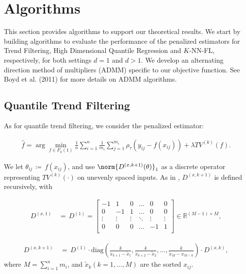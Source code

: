 \documentclass[twoside,11pt]{article}
\begin{document}
\section{Algorithms}
This section provides algorithms to support our theoretical results. We start by building algorithms to evaluate the performance of the penalized estimators for Trend Filtering, High Dimensional Quantile Regression and \( K \)-NN-FL, respectively, for both settings \( d = 1 \) and \( d > 1 \). 
We develop an alternating direction method of multipliers (ADMM) specific to our objective function. See Boyd et al. (2011) for more details on ADMM algorithms.
\subsection{Quantile Trend Filtering}



As for quantile trend filtering, we consider the penalized estimator:

\begin{align}
\label{70}
\hat{f} = \arg\min_{f\in F_k(1)} \frac{1}{n} \sum_{i=1}^{n} \frac{1}{m_i} \sum_{j=1}^{m_i} \rho_{\tau}(y_{ij} - f(x_{ij})) + \lambda TV^{(k)}(f). 
\end{align}

We let $\theta_{ij} \,\coloneqq\, f(x_{ij})$, and use $\norm{D^{(x, k+1)}(\theta)}_1$ as a discrete operator representing $TV^{(k)}(\cdot)$ on unevenly spaced inputs. As in \cite{tibshirani2014adaptive}, $D^{(x, k+1)}$ is defined recursively, with



\begin{align}
\label{71}
D^{(x, 1)} &\,=\, D^{(1)} = \begin{bmatrix}
    -1 &  1 & 0 & \dots & 0 & 0\\
     0 & -1 & 1 & \dots & 0 & 0\\
     \vdots & \vdots & \vdots & \ddots & \vdots & \vdots\\
     0 & 0 & 0 & \dots & -1 & 1 \\
\end{bmatrix} \in \mathbb{R}^{{(M - 1)} \times {M}},
\end{align}


\begin{align}
\label{72}
D^{(x, k+1)} &\,=\, D^{(1)} \cdot \text{diag}\left(\frac{k}{\tilde{x}_{k+1} - \tilde{x}_{1}}, \frac{k}{\tilde{x}_{k+2} - \tilde{x}_{2}}, \ldots, \frac{k}{\tilde{x}_{M} - x_{{M}-k}}\right) \cdot D^{(x, k)}, 
\end{align}
where $M = \sum_{i=1}^{n} m_{i}$, and $\tilde{x}_k (k = 1, ..., M)$ are the sorted $x_{ij}$.
\end{document}
